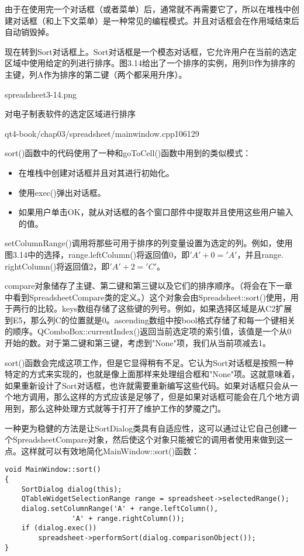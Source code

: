 \documentclass[11pt,oneside]{book}
\begin{document}
\begin{common-format}
由于在使用完一个对话框（或者菜单）后，通常就不再需要它了，所以在堆栈中创建对话框（和上下文菜单）是一种常见的编程模式。并且对话框会在作用域结束后自动销毁掉。

现在转到Sort对话框上。Sort对话框是一个模态对话框，它允许用户在当前的选定区域中使用给定的列进行排序。图3.14给出了一个排序的实例，用列B作为排序的主键，列A作为排序的第二键（两个都采用升序）。

\begin{linefig}[0.8]{spreadsheet3-14.png}
\caption{对电子制表软件的选定区域进行排序}
\label{fig:spreadsheet3-14.png}
\end{linefig}

\begin{cppline}{qt4-book/chap03/spreadsheet/mainwindow.cpp}{106}{129}
\end{cppline}

sort()函数中的代码使用了一种和goToCell()函数中用到的类似模式：
\begin{itemize}
\item 在堆栈中创建对话框并且对其进行初始化。
\item 使用exec()弹出对话框。
\item 如果用户单击OK，就从对话框的各个窗口部件中提取并且使用这些用户输入的值。
\end{itemize}

setColumnRange()调用将那些可用于排序的列变量设置为选定的列。例如，使用图3.14中的选择，range.leftColumn()将返回值0，即$'A'+0='A'$，并且range. rightColumn()将返回值2，即$'A'+2='C'$。

compare对象储存了主键、第二键和第三键以及它们的排序顺序。（将会在下一章中看到SpreadsheetCompare类的定义。）这个对象会由Spreadsheet::sort()使用，用于两行的比较。keys数组存储了这些键的列号。例如，如果选择区域是从C2扩展到E5，那么列C的位置就是0。ascending数组中按bool格式存储了和每一个键相关的顺序。QComboBox::currentIndex()返回当前选定项的索引值，该值是一个从0开始的数。对于第二键和第三键，考虑到"None"项，我们从当前项减去1。

sort()函数会完成这项工作，但是它显得稍有不足。它认为Sort对话框是按照一种特定的方式来实现的，也就是像上面那样来处理组合框和"None"项。这就意味着，如果重新设计了Sort对话框，也许就需要重新编写这些代码。如果对话框只会从一个地方调用，那么这样的方式应该是足够了，但是如果对话框可能会在几个地方调用到，那么这种处理方式就等于打开了维护工作的梦魇之门。

一种更为稳健的方法是让SortDialog类具有自适应性，这可以通过让它自己创建一个SpreadsheetCompare对象，然后使这个对象只能被它的调用者使用来做到这一点。这样就可以有效地简化MainWindow::sort()函数：
\begin{Verbatim}
void MainWindow::sort()
{
    SortDialog dialog(this);
    QTableWidgetSelectionRange range = spreadsheet->selectedRange();
    dialog.setColumnRange('A' + range.leftColumn(),
                'A' + range.rightColumn());
    if (dialog.exec())
        spreadsheet->performSort(dialog.comparisonObject());
}
\end{Verbatim}



\end{common-format}
\end{document}
